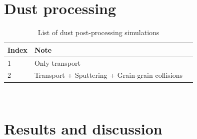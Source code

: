 \documentclass[fleqn,usenatbib]{mnras}
\begin{document}
\section{Dust processing}
 \begin{table}
 \centering
 \caption{List of dust post-processing simulations}
 \begin{tabular}{ l l l}
 \hline\hline
 Index&Note&\\\hline 
 1&Only transport&\\\hline  
 2&Transport + Sputtering + Grain-grain collisions&\\\hline 
 \end{tabular}
 \label{List_Dustsimulations}
 \end{table}
 
\newpage~
\newpage
\section{Results and discussion}
\end{document}
